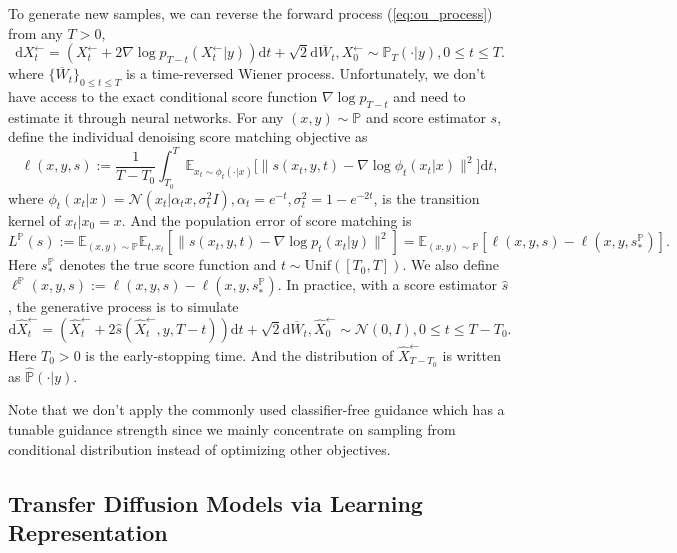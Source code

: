 \documentclass{article}
\numberwithin{equation}{section}
\def\eqref#1{equation~\ref{#1}}
\newcommand{\E}{\mathbb{E}}
\newcommand{\dif}{\mathrm{d}}
\theoremstyle{definition}
\renewcommand{\P}{\mathbb{P}}
\renewcommand{\eqref}[1]{(\ref{#1})}
\begin{document}
To generate new samples, we can reverse the forward process \eqref{eq:ou_process} from any $T>0$,
\begin{equation}
    \dif X_t^{\leftarrow} = (X_t^{\leftarrow} + 2\nabla\log p_{T-t}(X_t^{\leftarrow}|y))\dif t + \sqrt{2}\dif \overline{W}_t, X_0^\leftarrow\sim \P_T(\cdot|y), 0\leq t\leq T.
\end{equation}
where $\{\overline{W}_t\}_{0\leq t\leq T}$ is a time-reversed Wiener process. Unfortunately, we don't have access to the exact conditional score function $\nabla\log p_{T-t}$ and need to estimate it through neural networks.
For any $(x,y)\sim\P$ and score estimator $s$, define the individual denoising score matching objective \citep{vincent2011connection} as
\begin{equation}\label{eq:dsm}
    \ell(x,y,s):=\frac{1}{T-T_0}\int_{T_0}^T \E_{x_t\sim \phi_t(\cdot|x)}\big[\|s(x_t,y,t)-\nabla\log \phi_t(x_t|x)\|^2\big] \dif t,
\end{equation}
where $\phi_t(x_t|x)=\mathcal{N}(x_t|\alpha_tx,\sigma_t^2I),\alpha_t=e^{-t},\sigma_t^2=1-e^{-2t}$, is the transition kernel of $x_t|x_0=x$. 
And the population error of score matching is
\begin{equation}\label{eq:sm}
    L^\P(s):=\E_{(x,y)\sim\P}\E_{t,x_t}[\|s(x_t,y,t)-\nabla\log p_t(x_t|y)\|^2]=\E_{(x,y)\sim\P}[\ell(x,y,s)-\ell(x,y,s^\P_*)].
\end{equation}
Here $s^\P_*$ denotes the true score function and $t\sim \text{Unif}([T_0,T])$.
We also define $\ell^\P(x,y,s):=\ell(x,y,s)-\ell(x,y,s_*^\P)$.
In practice, with a score estimator $\widehat{s}$, the generative process is to simulate
\begin{equation}
    \dif \widehat{X}_t^{\leftarrow} = (\widehat{X}_t^{\leftarrow} + 2\widehat{s}(\widehat{X}_t^\leftarrow,y,T-t))\dif t + \sqrt{2}\dif \overline{W}_t, \widehat{X}_0^\leftarrow\sim \mathcal{N}(0,I), 0\leq t\leq T-T_0.
\end{equation}
Here $T_0>0$ is the early-stopping time.
And the distribution of $\widehat{X}_{T-T_0}^\leftarrow$ is written as $\widehat{\P}(\cdot|y)$.

Note that we don't apply the commonly used classifier-free guidance \citep{ho2022classifier} which has a tunable guidance strength since we mainly concentrate on sampling from conditional distribution instead of optimizing other objectives.

\subsection{Transfer Diffusion Models via Learning Representation}
\end{document}
